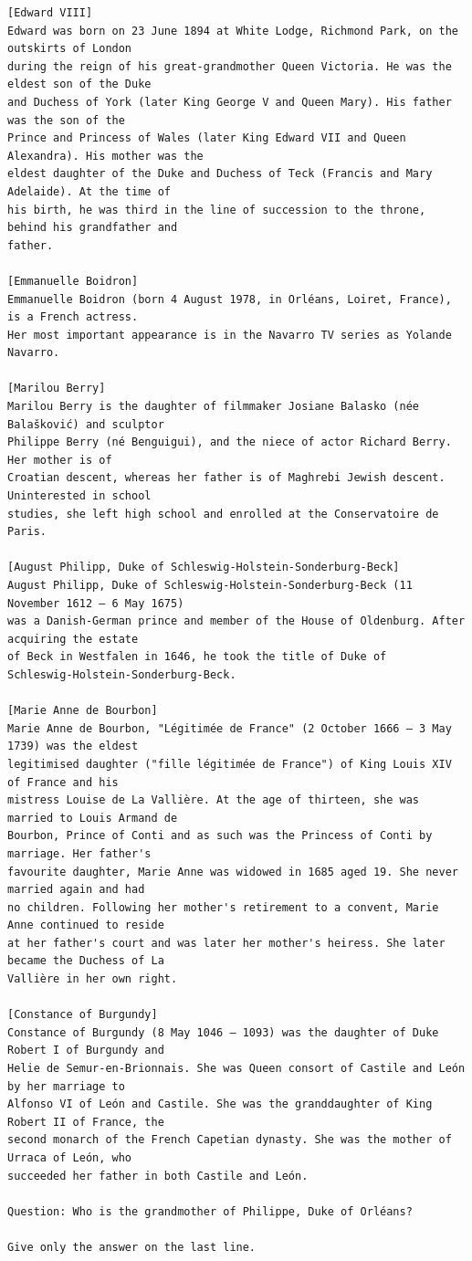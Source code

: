 \documentclass[10pt]{article}
\begin{document}
\begin{verbatim}
[Edward VIII]
Edward was born on 23 June 1894 at White Lodge, Richmond Park, on the outskirts of London
during the reign of his great-grandmother Queen Victoria. He was the eldest son of the Duke
and Duchess of York (later King George V and Queen Mary). His father was the son of the
Prince and Princess of Wales (later King Edward VII and Queen Alexandra). His mother was the
eldest daughter of the Duke and Duchess of Teck (Francis and Mary Adelaide). At the time of
his birth, he was third in the line of succession to the throne, behind his grandfather and
father.

[Emmanuelle Boidron]
Emmanuelle Boidron (born 4 August 1978, in Orléans, Loiret, France), is a French actress.
Her most important appearance is in the Navarro TV series as Yolande Navarro.

[Marilou Berry]
Marilou Berry is the daughter of filmmaker Josiane Balasko (née Balašković) and sculptor
Philippe Berry (né Benguigui), and the niece of actor Richard Berry. Her mother is of
Croatian descent, whereas her father is of Maghrebi Jewish descent. Uninterested in school
studies, she left high school and enrolled at the Conservatoire de Paris.

[August Philipp, Duke of Schleswig-Holstein-Sonderburg-Beck]
August Philipp, Duke of Schleswig-Holstein-Sonderburg-Beck (11 November 1612 – 6 May 1675)
was a Danish-German prince and member of the House of Oldenburg. After acquiring the estate
of Beck in Westfalen in 1646, he took the title of Duke of
Schleswig-Holstein-Sonderburg-Beck.

[Marie Anne de Bourbon]
Marie Anne de Bourbon, "Légitimée de France" (2 October 1666 – 3 May 1739) was the eldest
legitimised daughter ("fille légitimée de France") of King Louis XIV of France and his
mistress Louise de La Vallière. At the age of thirteen, she was married to Louis Armand de
Bourbon, Prince of Conti and as such was the Princess of Conti by marriage. Her father's
favourite daughter, Marie Anne was widowed in 1685 aged 19. She never married again and had
no children. Following her mother's retirement to a convent, Marie Anne continued to reside
at her father's court and was later her mother's heiress. She later became the Duchess of La
Vallière in her own right.

[Constance of Burgundy]
Constance of Burgundy (8 May 1046 – 1093) was the daughter of Duke Robert I of Burgundy and
Helie de Semur-en-Brionnais. She was Queen consort of Castile and León by her marriage to
Alfonso VI of León and Castile. She was the granddaughter of King Robert II of France, the
second monarch of the French Capetian dynasty. She was the mother of Urraca of León, who
succeeded her father in both Castile and León.

Question: Who is the grandmother of Philippe, Duke of Orléans?

Give only the answer on the last line.
\end{verbatim}
\end{document}
